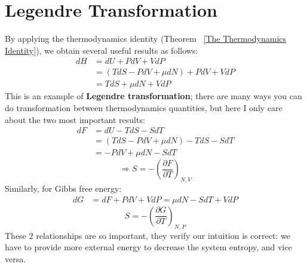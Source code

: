 \documentclass[~/PhyAI/phyai.tex]{subfiles}
\begin{document}
\section{Legendre Transformation}\label{sec:legendre_transformation} %
By applying the thermodynamics identity (Theorem ~\ref{The Thermodynamics Identity}), we obtain several useful results as follows:
\begin{equation*}
	\begin{split}
		dH&=dU+PdV+VdP\\
		&=(TdS-PdV+\mu dN)+PdV+VdP\\
		&=TdS+\mu dN+VdP
	\end{split}
\end{equation*}
This is an example of \textbf{Legendre transformation}; there are many ways you can do transformation between thermodynamics quantities, but here I only care about the two most important results:
\begin{equation*}
	\begin{split}
		dF&=dU-TdS-SdT\\
		&=(TdS-PdV+\mu dN)-TdS-SdT\\
		&=-PdV+\mu dN -SdT
	\end{split}
\end{equation*}
$$\Rightarrow S=-\left(\frac{\partial F}{\partial T}\right)_{N,V}$$
Similarly, for Gibbs free energy:
\begin{equation*}
	\begin{split}
		dG&=dF+PdV+VdP=\mu dN -SdT+VdP
	\end{split}
\end{equation*}
$$ S=-\left(\frac{\partial G}{\partial T}\right)_{N,P} $$
These $2$ relationships are so important, they verify our intuition is correct: we have to provide more external energy to decrease the system entropy, and vice versa.
\end{document}
